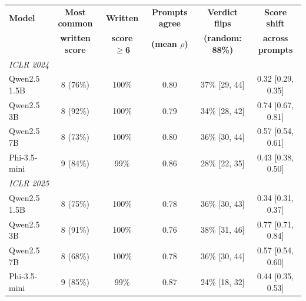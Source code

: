 \begin{tabular}{lccccc}
\toprule
\textbf{Model} & \textbf{Most common} & \textbf{Written} & \textbf{Prompts agree} & \textbf{Verdict flips} & \textbf{Score shift} \\
 & \textbf{written score} & \textbf{score $\ge$6} & \textbf{(mean $\rho$)} & \textbf{(random: 88\%)} & \textbf{across prompts} \\
\midrule
\multicolumn{6}{l}{\textit{ICLR 2024}} \\
Qwen2.5 1.5B & 8 (76\%) & 100\% & 0.80 & 37\% {\scriptsize[29, 44]} & 0.32 {\scriptsize[0.29, 0.35]} \\
Qwen2.5 3B & 8 (92\%) & 100\% & 0.79 & 34\% {\scriptsize[28, 42]} & 0.74 {\scriptsize[0.67, 0.81]} \\
Qwen2.5 7B & 8 (73\%) & 100\% & 0.80 & 36\% {\scriptsize[30, 44]} & 0.57 {\scriptsize[0.54, 0.61]} \\
Phi-3.5-mini & 9 (84\%) & 99\% & 0.86 & 28\% {\scriptsize[22, 35]} & 0.43 {\scriptsize[0.38, 0.50]} \\
\midrule
\multicolumn{6}{l}{\textit{ICLR 2025}} \\
Qwen2.5 1.5B & 8 (75\%) & 100\% & 0.78 & 36\% {\scriptsize[30, 43]} & 0.34 {\scriptsize[0.31, 0.37]} \\
Qwen2.5 3B & 8 (91\%) & 100\% & 0.76 & 38\% {\scriptsize[31, 46]} & 0.77 {\scriptsize[0.71, 0.84]} \\
Qwen2.5 7B & 8 (68\%) & 100\% & 0.78 & 36\% {\scriptsize[30, 44]} & 0.57 {\scriptsize[0.54, 0.60]} \\
Phi-3.5-mini & 9 (85\%) & 99\% & 0.87 & 24\% {\scriptsize[18, 32]} & 0.44 {\scriptsize[0.35, 0.53]} \\
\bottomrule
\end{tabular}
